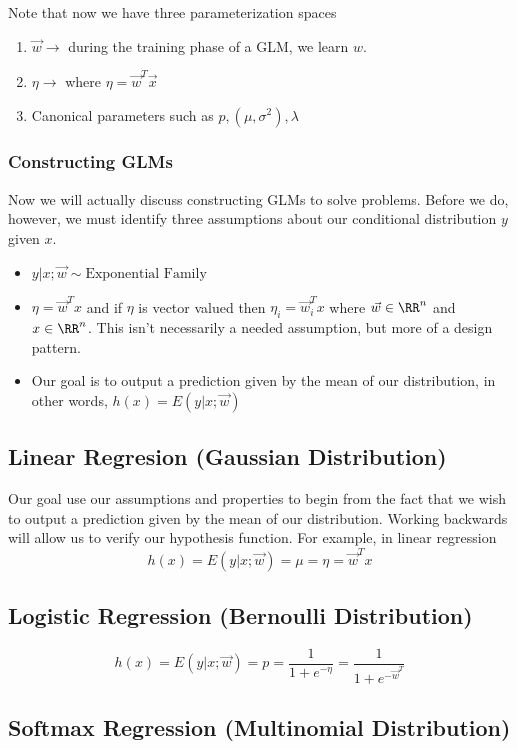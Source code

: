 \documentclass[12pt]{scrartcl}
\begin{document}
Note that now we have three parameterization spaces
\begin{enumerate}
    \item $\vec{w} \to $ during the training phase of a GLM, we learn $w$.
    \item $\eta \to $ where $\eta = \vec{w}^T\vec{x}$
    \item Canonical parameters such as $p, (\mu, \sigma^2), \lambda$
\end{enumerate}

\subsubsection{Constructing GLMs}

Now we will actually discuss constructing GLMs to solve problems. Before we do, however, we must identify three assumptions about our conditional distribution $y$ given $x$.
\begin{itemize}
    \item $y | x; \vec{w} \sim \text{Exponential Family}$
    \item $\eta = \vec{w}^Tx$ and if $\eta$ is vector valued then $\eta_i = \vec{w}_i^Tx$ where $\vec{w} \in \RR^n$ and $x \in \RR^n$. This isn't necessarily a needed assumption, but more of a design pattern.
    \item Our goal is to output a prediction given by the mean of our distribution, in other words, $h(x) = E(y | x; \vec{w})$
\end{itemize}

\subsection{Linear Regresion (Gaussian Distribution)}

Our goal use our assumptions and properties to begin from the fact that we wish to output a prediction given by the mean of our distribution. Working backwards will allow us to verify our hypothesis function. For example, in linear regression
\[h(x) = E(y | x; \vec{w}) = \mu = \eta = \vec{w}^Tx\]

\subsection{Logistic Regression (Bernoulli Distribution)}
\[h(x) = E(y | x; \vec{w}) = p = \frac{1}{1 + e^{-\eta}} = \frac{1}{1 + e^{-\vec{w}^T}}\]

\subsection{Softmax Regression (Multinomial Distribution)}
\end{document}
